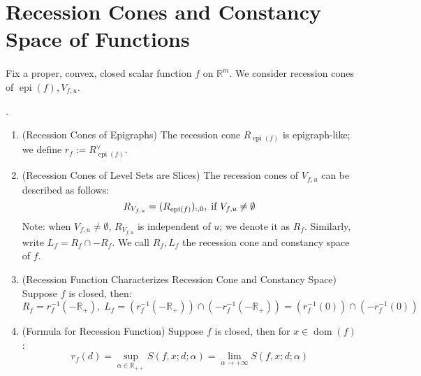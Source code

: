 \section{Recession Cones and Constancy Space of Functions}
\label{sect:024}

\paragraph{}Fix a proper, convex, closed scalar function $f$ on $\mathbb{R}^m$. We consider recession cones of $\operatorname{epi}(f),V_{f,u}$.

\begin{prop}\label{prop:024-recess-epi-level}
	.
	\begin{enumerate}[label=(\alph*)]
		\item (Recession Cones of Epigraphs) The recession cone $R_{\operatorname{epi}(f)}$ is epigraph-like; we define $r_f:=R_{\operatorname{epi}(f)}^\vee$.
		\item (Recession Cones of Level Sets are Slices) The recession cones of $V_{f,u}$ can be described as follows:
		      \[
			      R_{V_{f,u}}=(R_{\operatorname{epi}(f)})_{:,0},\;\text{if }V_{f,u}\neq\emptyset    \\
		      \]
		      Note: when $V_{f,u}\neq\emptyset$, $R_{V_{f,u}}$ is independent of $u$; we denote it as $R_f$. Similarly, write $L_{f}=R_f\cap -R_f$. We call $R_f,L_f$ the recession cone and constancy space of $f$.
		\item (Recession Function Characterizes Recession Cone and Constancy Space) Suppose $f$ is closed, then:
		      \[
			      R_f=r_f^{-1}\left(-\mathbb{R}_{+}\right),\;
			      L_f=\left(r_f^{-1}\left(-\mathbb{R}_{+}\right)\right)\cap\left(-r_f^{-1}(-\mathbb{R}_{+})\right)=\left(r_f^{-1}(0)\right)\cap\left(-r_f^{-1}(0)\right)
		      \]
		\item (Formula for Recession Function) Suppose $f$ is closed, then for $x\in \operatorname{dom}(f)$:
		      \[
			      r_f(d)=\underset{\alpha\in \mathbb{R}_{++}}{\operatorname{sup}}S(f,x; d; \alpha)
			      =\lim_{\alpha \to+\infty}S(f,x; d; \alpha)
		      \]
	\end{enumerate}
\end{prop}

